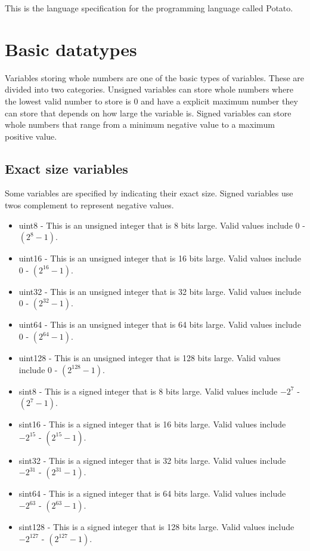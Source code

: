 \documentclass[12pt]{article}
\newcommand{\progLangName}{Potato}
\begin{document}
This is the language specification for the programming language called \progLangName .

\section{Basic datatypes}

Variables storing whole numbers are one of the basic types of variables. These are divided into two categories. Unsigned variables can store whole numbers where the lowest valid number to store is 0 and have a explicit maximum number they can store that depends on how large the variable is. Signed variables can store whole numbers that range from a minimum negative value to a maximum positive value.

\subsection{Exact size variables}

Some variables are specified by indicating their exact size. Signed variables use twos complement to represent negative values.
\begin{itemize}
\item uint8 - This is an unsigned integer that is 8 bits large. Valid values include 0 - $(2^8 - 1)$.
\item uint16 - This is an unsigned integer that is 16 bits large. Valid values include 0 - $(2^{16} - 1)$.
\item uint32 - This is an unsigned integer that is 32 bits large. Valid values include 0 - $(2^{32} - 1)$.
\item uint64 - This is an unsigned integer that is 64 bits large. Valid values include 0 - $(2^{64} - 1)$.
\item uint128 - This is an unsigned integer that is 128 bits large. Valid values include 0 - $(2^{128} - 1)$.

\item sint8 - This is a signed integer that is 8 bits large. Valid values include $-2^7$ - $(2^7 - 1)$.
\item sint16 - This is a signed integer that is 16 bits large. Valid values include $-2^{15}$ - $(2^{15} - 1)$.
\item sint32 - This is a signed integer that is 32 bits large. Valid values include $-2^{31}$ - $(2^{31} - 1)$.
\item sint64 - This is a signed integer that is 64 bits large. Valid values include $-2^{63}$ - $(2^{63} - 1)$.
\item sint128 - This is a signed integer that is 128 bits large. Valid values include $-2^{127}$ - $(2^{127} - 1)$.
\end{itemize}
\end{document}
